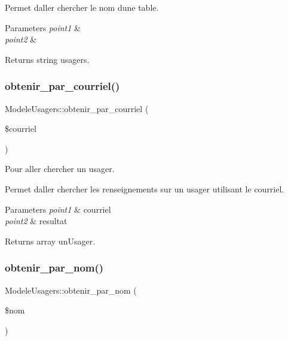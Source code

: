Permet d\textquotesingle{}aller chercher le nom d\textquotesingle{}une table. 
\begin{DoxyParams}{Parameters}
{\em point1} & \\
\hline
{\em point2} & \\
\hline
\end{DoxyParams}
\begin{DoxyReturn}{Returns}
string usagers. 
\end{DoxyReturn}
\mbox{\label{class_modele_usagers_a6a5533c1d0bb2106609c7d72dee7b09f}} 
\subsubsection{\texorpdfstring{obtenir\+\_\+par\+\_\+courriel()}{obtenir\_par\_courriel()}}
{\footnotesize\ttfamily Modele\+Usagers\+::obtenir\+\_\+par\+\_\+courriel (\begin{DoxyParamCaption}\item[{}]{\$courriel }\end{DoxyParamCaption})}



Pour aller chercher un usager. 

Permet d\textquotesingle{}aller chercher les renseignements sur un usager utilisant le courriel. 
\begin{DoxyParams}{Parameters}
{\em point1} & courriel \\
\hline
{\em point2} & resultat \\
\hline
\end{DoxyParams}
\begin{DoxyReturn}{Returns}
array un\+Usager. 
\end{DoxyReturn}
\mbox{\label{class_modele_usagers_a7d226551960685ce4ec5bd09a4410c05}} 
\subsubsection{\texorpdfstring{obtenir\+\_\+par\+\_\+nom()}{obtenir\_par\_nom()}}
{\footnotesize\ttfamily Modele\+Usagers\+::obtenir\+\_\+par\+\_\+nom (\begin{DoxyParamCaption}\item[{}]{\$nom }\end{DoxyParamCaption})}



